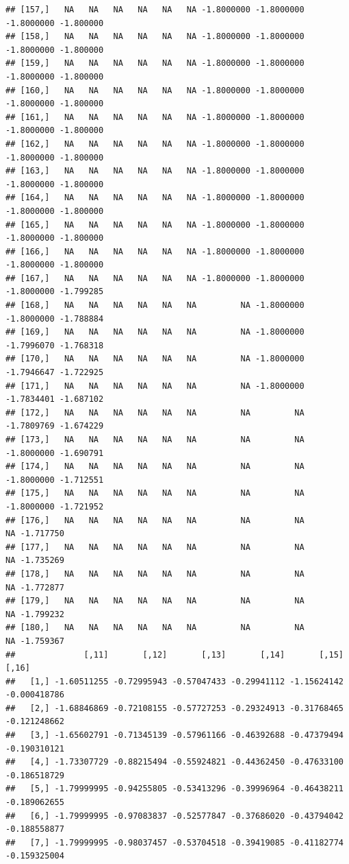 \documentclass{article}\usepackage[]{graphicx}\usepackage[]{color}
\makeatletter
\newenvironment{kframe}{%
 \def\at@end@of@kframe{}%
 \ifinner\ifhmode%
  \def\at@end@of@kframe{\end{minipage}}%
  \begin{minipage}{\columnwidth}%
 \fi\fi%
 \def\FrameCommand##1{\hskip\@totalleftmargin \hskip-\fboxsep
 \colorbox{shadecolor}{##1}\hskip-\fboxsep
     \hskip-\linewidth \hskip-\@totalleftmargin \hskip\columnwidth}%
 \MakeFramed {\advance\hsize-\width
   \@totalleftmargin\z@ \linewidth\hsize
   \@setminipage}}%
 {\par\unskip\endMakeFramed%
 \at@end@of@kframe}
\newenvironment{knitrout}{}{} %
\makeatother
\begin{document}
\begin{knitrout}
\begin{kframe}
\begin{verbatim}
## [157,]   NA   NA   NA   NA   NA   NA -1.8000000 -1.8000000 -1.8000000 -1.800000
## [158,]   NA   NA   NA   NA   NA   NA -1.8000000 -1.8000000 -1.8000000 -1.800000
## [159,]   NA   NA   NA   NA   NA   NA -1.8000000 -1.8000000 -1.8000000 -1.800000
## [160,]   NA   NA   NA   NA   NA   NA -1.8000000 -1.8000000 -1.8000000 -1.800000
## [161,]   NA   NA   NA   NA   NA   NA -1.8000000 -1.8000000 -1.8000000 -1.800000
## [162,]   NA   NA   NA   NA   NA   NA -1.8000000 -1.8000000 -1.8000000 -1.800000
## [163,]   NA   NA   NA   NA   NA   NA -1.8000000 -1.8000000 -1.8000000 -1.800000
## [164,]   NA   NA   NA   NA   NA   NA -1.8000000 -1.8000000 -1.8000000 -1.800000
## [165,]   NA   NA   NA   NA   NA   NA -1.8000000 -1.8000000 -1.8000000 -1.800000
## [166,]   NA   NA   NA   NA   NA   NA -1.8000000 -1.8000000 -1.8000000 -1.800000
## [167,]   NA   NA   NA   NA   NA   NA -1.8000000 -1.8000000 -1.8000000 -1.799285
## [168,]   NA   NA   NA   NA   NA   NA         NA -1.8000000 -1.8000000 -1.788884
## [169,]   NA   NA   NA   NA   NA   NA         NA -1.8000000 -1.7996070 -1.768318
## [170,]   NA   NA   NA   NA   NA   NA         NA -1.8000000 -1.7946647 -1.722925
## [171,]   NA   NA   NA   NA   NA   NA         NA -1.8000000 -1.7834401 -1.687102
## [172,]   NA   NA   NA   NA   NA   NA         NA         NA -1.7809769 -1.674229
## [173,]   NA   NA   NA   NA   NA   NA         NA         NA -1.8000000 -1.690791
## [174,]   NA   NA   NA   NA   NA   NA         NA         NA -1.8000000 -1.712551
## [175,]   NA   NA   NA   NA   NA   NA         NA         NA -1.8000000 -1.721952
## [176,]   NA   NA   NA   NA   NA   NA         NA         NA         NA -1.717750
## [177,]   NA   NA   NA   NA   NA   NA         NA         NA         NA -1.735269
## [178,]   NA   NA   NA   NA   NA   NA         NA         NA         NA -1.772877
## [179,]   NA   NA   NA   NA   NA   NA         NA         NA         NA -1.799232
## [180,]   NA   NA   NA   NA   NA   NA         NA         NA         NA -1.759367
##              [,11]       [,12]       [,13]       [,14]       [,15]        [,16]
##   [1,] -1.60511255 -0.72995943 -0.57047433 -0.29941112 -1.15624142 -0.000418786
##   [2,] -1.68846869 -0.72108155 -0.57727253 -0.29324913 -0.31768465 -0.121248662
##   [3,] -1.65602791 -0.71345139 -0.57961166 -0.46392688 -0.47379494 -0.190310121
##   [4,] -1.73307729 -0.88215494 -0.55924821 -0.44362450 -0.47633100 -0.186518729
##   [5,] -1.79999995 -0.94255805 -0.53413296 -0.39996964 -0.46438211 -0.189062655
##   [6,] -1.79999995 -0.97083837 -0.52577847 -0.37686020 -0.43794042 -0.188558877
##   [7,] -1.79999995 -0.98037457 -0.53704518 -0.39419085 -0.41182774 -0.159325004

\end{verbatim}
\end{kframe}
\end{knitrout}
\end{document}
